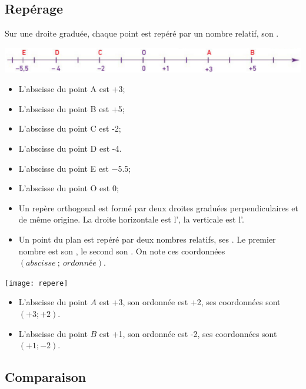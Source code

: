 \subsection{Repérage}

\begin{mydef}
	Sur une droite graduée, chaque point est repéré par un nombre relatif, son .
\end{mydef}


\begin{myex}
	\begin{center}
		\includegraphics[scale=0.5]{img/droite2}		
	\end{center}

	\begin{multicols}{2}
		\begin{itemize}
		\item L'abscisse du point A est +3;
		\item L'abscisse du point B est +5;
		\item L'abscisse du point C est -2;
		\item L'abscisse du point D est -4.
		\item L'abscisse du point E est \num{-5.5};
		\item L'abscisse du point O est 0;
	\end{itemize}
	\end{multicols}
\end{myex}


\begin{mydefs}
	\begin{itemize}
		\item Un repère orthogonal est formé par deux droites graduées perpendiculaires et de même origine. La droite horizontale est l', la verticale est l'.
		
		\item Un point du plan est repéré par deux nombres relatifs, ses . Le premier nombre est son , le second son . On note ces coordonnées $(abscisse \: ; \: ordonnée)$.
	\end{itemize}
\end{mydefs}


\begin{myexs}
	
		\begin{center}
			\texttt{[image: repere]}
		\end{center}
	

	\begin{itemize}
		\item L'abscisse du point $A$ est +3, son ordonnée est +2, ses coordonnées sont $(+3; +2)$.
		
		\item L'abscisse du point $B$ est +1, son ordonnée est -2, ses coordonnées sont $(+1; -2)$.
	\end{itemize}

\end{myexs}


\subsection{Comparaison}